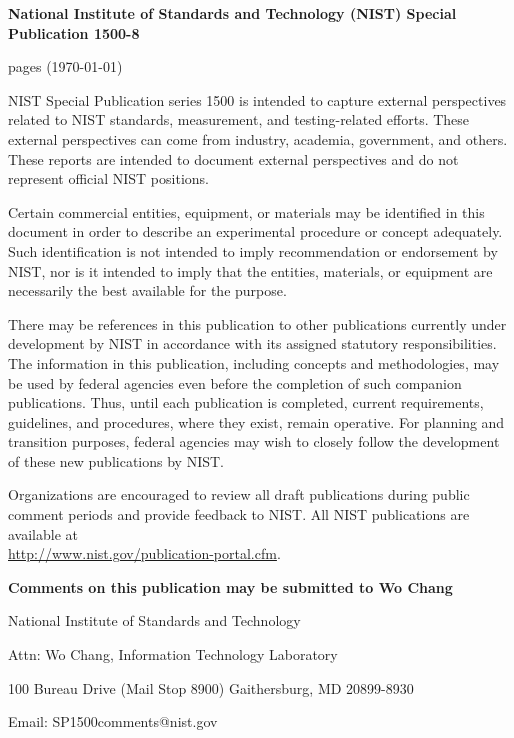 \newpage
\begin{center}
{\bf National Institute of Standards and Technology (NIST) Special
  Publication 1500-8}

\pageref{LastPage} pages (\today)
\end{center}

NIST Special Publication series 1500 is intended to capture external perspectives related to NIST 
standards, measurement, and testing-related efforts. These external perspectives can come from 
industry, academia, government, and others. These reports are intended to document external 
perspectives and do not represent official NIST positions.

\begin{mdframed}[backgroundcolor=black!5,topline=false,bottomline=false,rightline=false,leftline=false]

Certain commercial entities, equipment, or materials may be identified in this document in order to describe an 
experimental procedure or concept adequately. Such identification is not intended to imply recommendation or 
endorsement by NIST, nor is it intended to imply that the entities, materials, or equipment are necessarily the best 
available for the purpose. 

There may be references in this publication to other publications currently under development by NIST in 
accordance with its assigned statutory responsibilities. The information in this publication, including concepts and 
methodologies, may be used by federal agencies even before the completion of such companion publications. Thus, 
until each publication is completed, current requirements, guidelines, and procedures, where they exist, remain 
operative. For planning and transition purposes, federal agencies may wish to closely follow the development of 
these new publications by NIST. 

Organizations are encouraged to review all draft publications during public comment periods and provide feedback 
to NIST. All NIST publications are available at \\
\url{http://www.nist.gov/publication-portal.cfm}.

\end{mdframed}

\bigskip \bigskip \bigskip

\begin{center}
{\bf Comments on this publication may be submitted to Wo Chang}
\bigskip

National Institute of Standards and Technology

Attn: Wo Chang, Information Technology Laboratory

100 Bureau Drive (Mail Stop 8900) Gaithersburg, MD 20899-8930

Email: SP1500comments@nist.gov 
\end{center}

